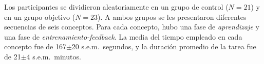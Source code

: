 
Los participantes se dividieron aleatoriamente en un grupo de control ($N=21$) y en un grupo objetivo ($N=23$). A ambos grupos se les presentaron diferentes secuencias de seis conceptos. Para cada concepto, hubo una fase de {\em aprendizaje} y una fase de {\em entrenamiento-feedback}. La media del tiempo empleado en cada concepto fue de 167$\pm$20 s.e.m.\ segundos, y la duración promedio de la tarea fue de 21$\pm$4 s.e.m.\ minutos. 


